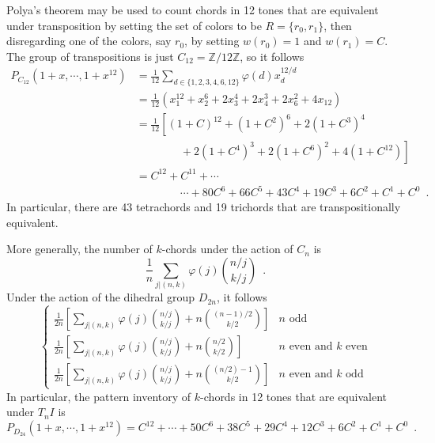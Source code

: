 \begin{example}
	Polya's theorem may be used to count chords in 12 tones that are equivalent under
	transposition by setting the set of colors to be $R = \{ r_0, r_1 \}$, then disregarding
	one of the colors, say $r_0$, by setting $w(r_0) = 1$ and $w(r_1) = C$. The group of
	transpositions is just $C_{12} = \mathbb{Z} / 12 \mathbb{Z}$, so it follows
		\begin{align}
			P_{C_{12}}(1 + x, \cdots, 1 + x^{12})
			& = \frac{1}{12} \sum_{d \in \{ 1, 2, 3, 4, 6, 12 \}} \varphi(d) x_d^{12 / d} \\
			& = \frac{1}{12} \left( x_1^{12} + x_2^{6} + 2 x_3^{4} + 2 x_4^{3} +
			2 x_6^{2} + 4 x_{12} \right) \\
			& = \frac{1}{12} \left[ (1 + C)^{12} + (1 + C^2)^{6} + 2 (1 + C^3)^{4} \right. \\
			& \qquad \qquad
			+ \left. 2 (1 + C^4)^{3} + 2 (1 + C^6)^{2} + 4 (1 + C^{12}) \right] \\
			& = C^{12} + C^{11} + \cdots \\
			& \qquad \qquad
			\cdots + 80 C^6 + 66 C^5 + 43 C^4 + 19 C^3 + 6 C^2 + C^1 + C^0 \enspace.
		\end{align}
	In particular, there are 43 tetrachords and 19 trichords that are transpositionally
	equivalent.
\end{example}

\begin{example}
	\cite[53]{Reiner1985}
	More generally, the number of $k$-chords under the action of $C_n$ is
	\begin{equation}
		\frac{1}{n} \sum_{j | (n, k)} \varphi(j) {{n / j}\choose{k / j}} \enspace.
	\end{equation}
	Under the action of the dihedral group $D_{2n}$, it follows
	\begin{equation}
		\begin{cases}
 			\frac{1}{2n} \left[ \sum_{j | (n, k)} \varphi(j) {{n / j}\choose{k / j}} +
 			n {{(n - 1) / 2} \choose{k / 2}} \right] & n \text{ odd} \\
 			\frac{1}{2n} \left[ \sum_{j | (n, k)} \varphi(j) {{n / j}\choose{k / j}} +
 			n {{n / 2} \choose{k / 2}} \right] & n \text{ even and } k \text{ even} \\
 			\frac{1}{2n} \left[ \sum_{j | (n, k)} \varphi(j) {{n / j}\choose{k / j}} +
 			n {{(n / 2) - 1} \choose{k / 2}} \right] & n \text{ even and } k \text{ odd}
 		\end{cases}
	\end{equation}
	In particular, the pattern inventory of $k$-chords in 12 tones that are equivalent under
	$T_nI$ is
	\begin{equation}
		P_{D_{24}}(1 + x, \cdots, 1 + x^{12}) = C^{12} + \cdots + 50 C^6 +
		38 C^5 + 29 C^4 + 12 C^3 + 6 C^2 + C^1 + C^0 \enspace.
	\end{equation}
\end{example}

